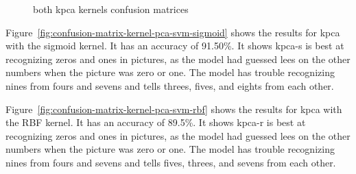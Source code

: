 \begin{figure}
    \centering
    \qquad
    \caption{both \gls{kpca} kernels confusion matrices}
    \label{fig:kpca-kernels}
\end{figure}

Figure~\ref{fig:confusion-matrix-kernel-pca-svm-sigmoid} shows the results for \gls{kpca} with the sigmoid kernel. It has an accuracy of 91.50\%. It shows \gls{kpca-s} is best at recognizing zeros and ones in pictures, as the model had guessed lees on the other numbers when the picture was zero or one. The model has trouble recognizing nines from fours and sevens and tells threes, fives, and eights from each other.

Figure~\ref{fig:confusion-matrix-kernel-pca-svm-rbf} shows the results for \gls{kpca} with the RBF kernel. It has an accuracy of 89.5\%. It shows \gls{kpca-r} is best at recognizing zeros and ones in pictures, as the model had guessed lees on the other numbers when the picture was zero or one. The model has trouble recognizing nines from fours and sevens and tells fives, threes, and sevens from each other.

